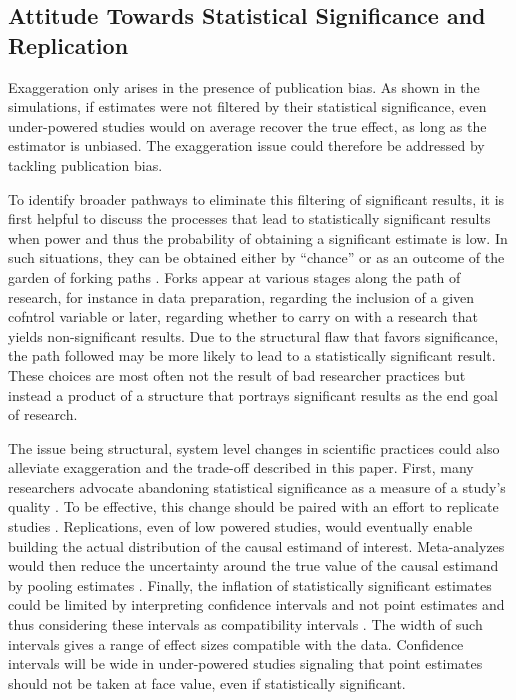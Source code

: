 \documentclass[usletter, 12pt]{article}
\begin{document}
				
	\subsection{Attitude Towards Statistical Significance and Replication}
	
		Exaggeration only arises in the presence of publication bias. As shown in the simulations, if estimates were not filtered by their statistical significance, even under-powered studies would on average recover the true effect, as long as the estimator is unbiased. The exaggeration issue could therefore be addressed by tackling publication bias. 
		
		To identify broader pathways to eliminate this filtering of significant results, it is first helpful to discuss the processes that lead to statistically significant results when power and thus the probability of obtaining a significant estimate is low. In such situations, they can be obtained either by ``chance'' or as an outcome of the garden of forking paths \citep{simmons_false-positive_2011, gelman_garden_2013, kasy_forking_2021}. Forks appear at various stages along the path of research, for instance in data preparation, regarding the inclusion of a given cofntrol variable or later, regarding whether to carry on with a research that yields non-significant results. Due to the structural flaw that favors significance, the path followed may be more likely to lead to a statistically significant result. These choices are most often not the result of bad researcher practices but instead a product of a structure that portrays significant results as the end goal of research. 
		
		The issue being structural, system level changes in scientific practices could also alleviate exaggeration and the trade-off described in this paper. First, many researchers advocate abandoning statistical significance as a measure of a study's quality \citep{mcshane_abandon_2019}. To be effective, this change should be paired with an effort to replicate studies \citep{christensen_transparency_2018}. Replications, even of low powered studies, would eventually enable building the actual distribution of the causal estimand of interest. Meta-analyzes would then reduce the uncertainty around the true value of the causal estimand by pooling estimates \citep{hernan_causal_2022}. Finally, the inflation of statistically significant estimates could be limited by interpreting confidence intervals and not point estimates and thus considering these intervals as compatibility intervals \citep{shadish_experimental_2002, amrhein_inferential_2019, romer_praise_2020}. The width of such intervals gives a range of effect sizes compatible with the data. Confidence intervals will be wide in under-powered studies signaling that point estimates should not be taken at face value, even if statistically significant.
\end{document}

